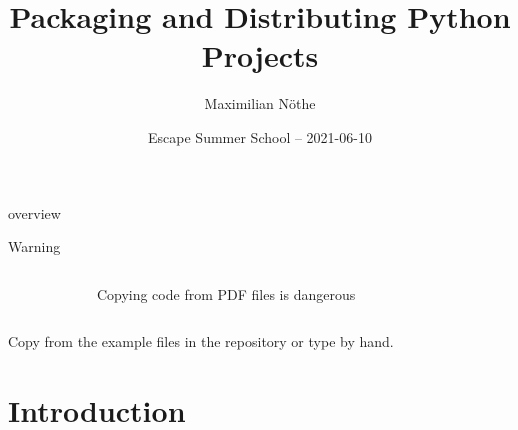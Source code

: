 
\author[M. Nöthe]{Maximilian Nöthe}
\title[Packaging]{Packaging and Distributing Python Projects}
\date[2021-06-10]{Escape Summer School – 2021-06-10}



\maketitle

\begin{frame}[c]{overview}
  \tableofcontents
\end{frame}

\begin{frame}[c]{Warning}
  \centering
  \Large\color{vertexDarkRed}
  \vspace{3\baselineskip}

  \begin{columns}[onlytextwidth, c]%
    \begin{column}{0.15\textwidth}%
      \fontsize{60}{60}\selectfont%
    \end{column}%
    \hfill%
    \begin{column}{0.7\textwidth}%
      \centering
      Copying code from PDF files is dangerous \\
    \end{column}%
    \hfill%
    \begin{column}{0.15\textwidth}%
      \hfill%
      \fontsize{60}{60}\selectfont%
      \hfill{}%
    \end{column}%
  \end{columns}%

  \vspace{2\baselineskip}
  Copy from the example files in the repository or type by hand.
\end{frame}

\section{Introduction}

